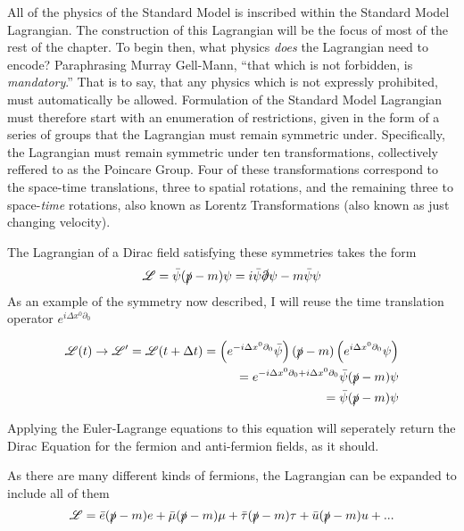     All of the physics of the Standard Model is inscribed within the Standard Model Lagrangian.
    The construction of this Lagrangian will be the focus of most of the rest of the chapter.
    To begin then, what physics \textit{does} the Lagrangian need to encode?
    Paraphrasing Murray Gell-Mann, ``that which is not forbidden, is \textit{mandatory}.''
    That is to say, that any physics which is not expressly prohibited, must automatically be allowed.
    Formulation of the Standard Model Lagrangian must therefore start with an enumeration of restrictions,
        given in the form of a series of groups that the Lagrangian must remain symmetric under.
    Specifically, the Lagrangian must remain symmetric under ten transformations,
        collectively reffered to as the Poincare Group.
    Four of these transformations correspond to the space-time translations,
        three to spatial rotations, and the remaining three to space-\textit{time} rotations,
        also known as Lorentz Transformations (also known as just changing velocity).

    The Lagrangian of a Dirac field satisfying these symmetries takes the form
    \begin{equation}
        \mathscr{L} = \bar{\psi} (\slashed{p} - m) \psi = i \bar{\psi} \slashed{\partial} \psi - m \bar{\psi} \psi
    \end{equation}
    As an example of the symmetry now described, I will reuse the time translation operator $e^{i\Delta x^0 \partial_0}$

    \begin{equation} \begin{split}
        \mathscr{L}(t) \to \mathscr{L}' = \mathscr{L}(t+\Delta t) =
            \left( e^{-i\Delta x^0 \partial_0} \bar{\psi} \right) (\slashed{p} - m) \left( e^{i\Delta x^0 \partial_0}\psi \right)
        \\  = e^{-i\Delta x^0 \partial_0 + i \Delta x^0 \partial_0} \bar{\psi} (\slashed{p} - m) \psi
        \\  = \bar{\psi} (\slashed{p} - m) \psi
    \end{split} \end{equation}

    Applying the Euler-Lagrange equations to this equation will seperately return the Dirac Equation
        for the fermion and anti-fermion fields, as it should.

    As there are many different kinds of fermions, the Lagrangian can be expanded to include all of them
    \begin{equation}
        \mathscr{L} = \bar{e} (\slashed{p} - m) e
        + \bar{\mu} (\slashed{p} - m) \mu
        + \bar{\tau} (\slashed{p} - m) \tau
        + \bar{u} (\slashed{p} - m) u
        + ...
    \end{equation}

